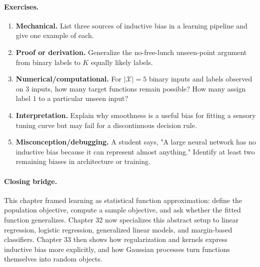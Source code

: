 \paragraph{Exercises.}
\begin{enumerate}[label=\textbf{31.4.\arabic*.}, leftmargin=*]
\item \textbf{Mechanical.} List three sources of inductive bias in a learning pipeline and give one example of each.
\item \textbf{Proof or derivation.} Generalize the no-free-lunch unseen-point argument from binary labels to \(K\) equally likely labels.
\item \textbf{Numerical/computational.} For \(|\mathcal X|=5\) binary inputs and labels observed on \(3\) inputs, how many target functions remain possible? How many assign label \(1\) to a particular unseen input?
\item \textbf{Interpretation.} Explain why smoothness is a useful bias for fitting a sensory tuning curve but may fail for a discontinuous decision rule.
\item \textbf{Misconception/debugging.} A student says, "A large neural network has no inductive bias because it can represent almost anything." Identify at least two remaining biases in architecture or training.
\end{enumerate}

\paragraph{Closing bridge.}
This chapter framed learning as statistical function approximation: define the population objective, compute a sample objective, and ask whether the fitted function generalizes. Chapter 32 now specializes this abstract setup to linear regression, logistic regression, generalized linear models, and margin-based classifiers. Chapter 33 then shows how regularization and kernels express inductive bias more explicitly, and how Gaussian processes turn functions themselves into random objects.

\clearpage
